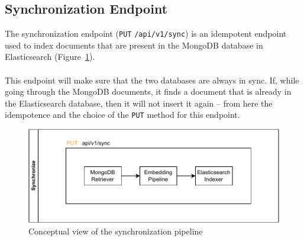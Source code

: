 \subsection{Synchronization Endpoint}\label{subsec:synchronization-endpoint-1}
The synchronization endpoint (\verb|PUT| \verb|/api/v1/sync|) is an idempotent endpoint used to index documents that are present in the MongoDB database in Elasticsearch (Figure~\ref{fig:flow-sync}). \\ \\
This endpoint will make sure that the two databases are always in sync.
If, while going through the MongoDB documents, it finds a document that is already in the Elasticsearch database, then it will not insert it again -- from here the idempotence and the choice of the \verb|PUT| method for this endpoint.

\begin{figure}[!h]
    \begin{center}
        \includegraphics[width=0.7\linewidth]{assets/pdf/architecture/flow-sync}
    \end{center}

    \caption{Conceptual view of the synchronization pipeline}
    \label{fig:flow-sync}
\end{figure}
